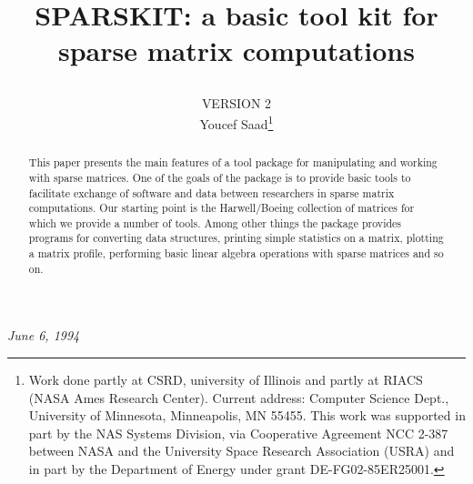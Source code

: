 \documentclass[12pt]{article}
\title{
\parbox{4in}{SPARSKIT: a basic tool kit for sparse 
matrix computations } }
\author{\parbox{4in}{VERSION 2\\Youcef Saad\thanks{
Work done partly at CSRD, university of Illinois and partly at RIACS
(NASA Ames Research Center). Current address: Computer Science Dept.,
University of Minnesota, Minneapolis, MN 55455.
This work was supported in part by the NAS Systems 
Division, via Cooperative Agreement NCC 2-387 between NASA and 
the University Space Research Association (USRA)
and in part  by the Department of Energy under grant 
DE-FG02-85ER25001.}}}
\date{ }
\begin{document}

%

\maketitle

\vskip 1.5in

\centerline{{\it June 6, 1994} } 

\thispagestyle{empty}

\begin{abstract} 
This paper presents the main features of a tool package for 
manipulating and working with sparse matrices.
One of the  goals of the package is to provide 
basic tools to facilitate exchange of software and data
between researchers in sparse matrix computations.
Our starting point is the Harwell/Boeing collection of matrices
for which we provide a number of tools. 
Among other things the package provides programs for converting
data structures, printing simple statistics on a matrix, 
plotting a matrix profile, performing  basic linear algebra 
operations  with sparse matrices  and so on.
\end{abstract}

\newpage
\end{document}
